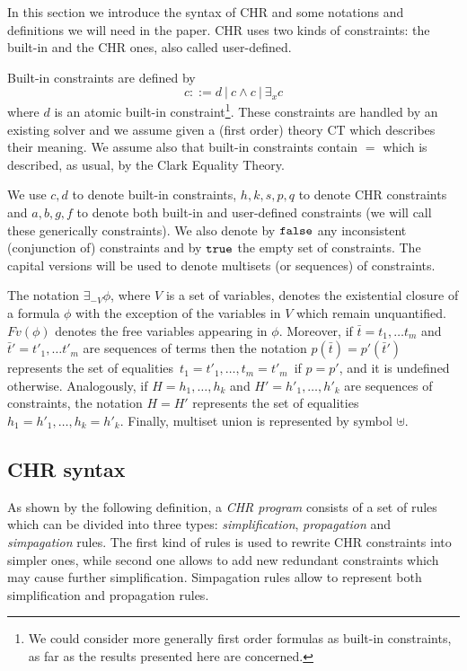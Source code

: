 \documentclass[final]{acmtrans2e}
\begin{document}
In this section we introduce the syntax of CHR and some notations
and definitions we will need in the paper. CHR uses two kinds
of constraints: the built-in and the CHR ones, also called
user-defined.

Built-in constraints are defined by
$$ c ::= d \ | \ c \wedge c \ | \ \exists_x c $$
where $d$ is an atomic built-in constraint\footnote{We could
consider more generally first order formulas as built-in
constraints, as far as the results presented here are concerned.}.
These constraints are handled by an existing solver and we assume
given a (first order) theory CT which describes their meaning.
We assume also that built-in constraints contain $=$ which is described, as usual, by the Clark Equality Theory.

We use $c,d$ to denote built-in constraints, $h,k,s, p, q$ to denote CHR
constraints and $a,b, g, f$ to denote both built-in and user-defined
constraints (we will call these generically constraints).  We also
denote by ${\tt false}$ any inconsistent (conjunction of)
constraints and by ${\tt true}$ the empty set of
constraints. The capital versions will be used to denote multisets
(or sequences) of constraints.


The notation $\exists_{-V}\phi$, where $V$ is a set of variables,
denotes the existential closure of a formula $\phi$ with the
exception of the variables in $V$ which remain unquantified.
$Fv(\phi)$ denotes the free variables appearing in $\phi$.
Moreover, if $\bar t= t_1, \ldots t_m$ and $\bar t'= t'_1, \ldots t'_m$ are sequences of terms then the notation
$p(\bar t) = p'(\bar t')$
represents the set of equalities $\,t_1=t'_1, \ldots, t_m=t'_m\,$ if $p=p'$, and it is undefined otherwise.
Analogously, if $H=h_1, \ldots, h_k$ and $H'= h'_1, \ldots, h'_k$ are sequences of constraints, the notation
$H=H'$ represents the set of equalities $h_1=h'_1, \ldots, h_k=h'_k$.
Finally, multiset union is represented by symbol $\uplus$.

\subsection{CHR syntax}\label{sec:syntax}
As shown by the following definition, a  \emph{CHR program}
consists of a set of rules which can be divided into three types:
\emph{simplification}, \emph{propagation} and \emph{simpagation}
rules. The first kind of rules is used to rewrite
CHR constraints into simpler ones, while second one allows to add new redundant
constraints which may cause further simplification. Simpagation rules allow to represent both simplification and propagation rules.
\end{document}
